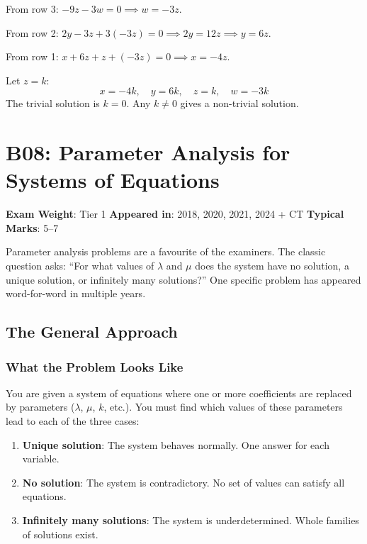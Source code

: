 \documentclass[
]{article}
\providecommand{\tightlist}{%
  \setlength{\itemsep}{0pt}\setlength{\parskip}{0pt}}
\renewenvironment{quote}
  {\begin{tcolorbox}[
     colback=calloutbg,
     colframe=calloutframe,
     colupper=callouttext,
     arc=3pt,
     boxrule=0.5pt,
     leftrule=0.5pt,
     borderline west={3pt}{0pt}{calloutaccent},
     left=8pt,
     right=8pt,
     top=6pt,
     bottom=6pt
   ]}
  {\end{tcolorbox}}
\begin{document}
From row 3: \(-9z - 3w = 0 \implies w = -3z\).

From row 2: \(2y - 3z + 3(-3z) = 0 \implies 2y = 12z \implies y = 6z\).

From row 1: \(x + 6z + z + (-3z) = 0 \implies x = -4z\).

Let \(z = k\):
\[
x = -4k, \quad y = 6k, \quad z = k, \quad w = -3k
\]
The trivial solution is \(k = 0\). Any \(k \neq 0\) gives a non-trivial
solution.

\section{B08: Parameter Analysis for Systems of
Equations}\label{b08-parameter-analysis-for-systems-of-equations}

\begin{quote}
\textbf{Exam Weight}: Tier 1 \textbar{} \textbf{Appeared in}: 2018,
2020, 2021, 2024 + CT \textbar{} \textbf{Typical Marks}: 5--7
\end{quote}

Parameter analysis problems are a favourite of the examiners. The
classic question asks: ``For what values of \(\lambda\) and \(\mu\) does
the system have no solution, a unique solution, or infinitely many
solutions?'' One specific problem has appeared word-for-word in multiple
years.

\subsection{The General Approach}\label{the-general-approach}

\subsubsection{What the Problem Looks
Like}\label{what-the-problem-looks-like}

You are given a system of equations where one or more coefficients are
replaced by parameters (\(\lambda\), \(\mu\), \(k\), etc.). You must
find which values of these parameters lead to each of the three cases:

\begin{enumerate}
\def\labelenumi{\arabic{enumi}.}
\tightlist
\item
  \textbf{Unique solution}: The system behaves normally. One answer for
  each variable.
\item
  \textbf{No solution}: The system is contradictory. No set of values
  can satisfy all equations.
\item
  \textbf{Infinitely many solutions}: The system is underdetermined.
  Whole families of solutions exist.
\end{enumerate}
\end{document}

